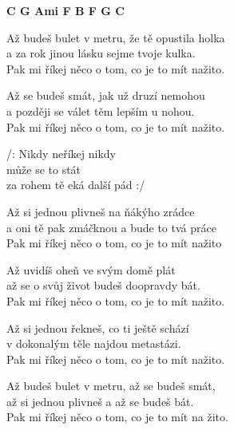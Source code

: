 
\re{}
\begin{footnotesize}
\textbf{C G Ami F B F G C}
\end{footnotesize}
 
\ve{}
Až budeš bulet v metru, že tě opustila holka\\
a za rok jinou lásku sejme tvoje kulka.\\
Pak mi říkej něco o tom, co je to mít nažito.

Až se budeš smát, jak už druzí nemohou\\
a později se válet těm lepším u nohou.\\
Pak mi říkej něco o tom, co je to mít nažito.
 
\cho{}
/: Nikdy neříkej nikdy\\
může se to stát\\
za rohem tě eká další pád :/

\ve{}
Až si jednou plivneš na ňákýho zrádce\\
a oni tě pak zmáčknou a bude to tvá práce\\
Pak mi říkej něco o tom, co je to mít nažito

Až uvidíš oheň ve svým domě plát\\
až se o svůj život budeš doopravdy bát.\\
Pak mi říkej něco o tom, co je to mít nažito.

\cho{}

\ve{}
Až si jednou řekneš, co ti ještě schází\\
v dokonalým těle najdou metastázi.\\
Pak mi říkej něco o tom, co je to mít nažito.

Až budeš bulet v metru, až se budeš smát,\\
až si jednou plivneš a až se budeš bát.\\
Pak mi říkej něco o tom, co je to mít na žito.

\cho{}

\esong